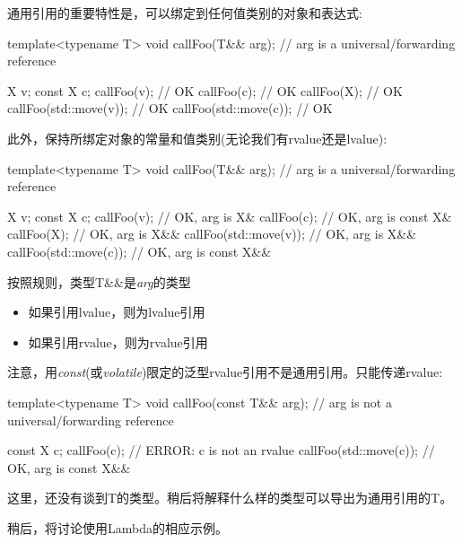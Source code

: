 
通用引用的重要特性是，可以绑定到任何值类别的对象和表达式:\par

\begin{codebox}[cpp]
template<typename T>
void callFoo(T&& arg); // arg is a universal/forwarding reference

X v;
const X c;
callFoo(v); // OK
callFoo(c); // OK
callFoo(X{}); // OK
callFoo(std::move(v)); // OK
callFoo(std::move(c)); // OK
\end{codebox}

此外，保持所绑定对象的常量和值类别(无论我们有rvalue还是lvalue):\par

\begin{codebox}[cpp]
template<typename T>
void callFoo(T&& arg); // arg is a universal/forwarding reference

X v;
const X c;
callFoo(v); // OK, arg is X&
callFoo(c); // OK, arg is const X&
callFoo(X{}); // OK, arg is X&&
callFoo(std::move(v)); // OK, arg is X&&
callFoo(std::move(c)); // OK, arg is const X&&
\end{codebox}

按照规则，类型T\&\&是\textit{arg}的类型\par

\begin{itemize}
  \item 如果引用lvalue，则为lvalue引用
  \item 如果引用rvalue，则为rvalue引用
\end{itemize}

注意，用\textit{const}(或\textit{volatile})限定的泛型rvalue引用不是通用引用。只能传递rvalue:\par

\begin{codebox}[cpp]
template<typename T>
void callFoo(const T&& arg); // arg is not a universal/forwarding reference

const X c;
callFoo(c); // ERROR: c is not an rvalue
callFoo(std::move(c)); // OK, arg is const X&&
\end{codebox}

这里，还没有谈到T的类型。稍后将解释什么样的类型可以导出为通用引用的T。\par

稍后，将讨论使用Lambda的相应示例。\par


